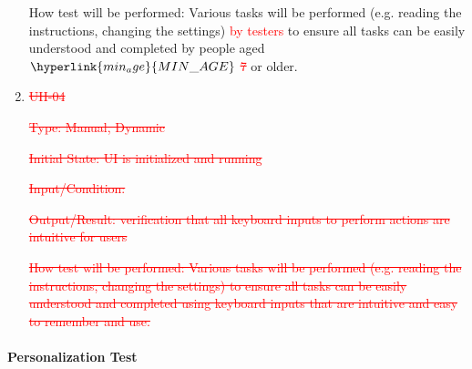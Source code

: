 \documentclass[12pt, titlepage]{article}
\begin{document}
\begin{enumerate}
How test will be performed: Various tasks will be performed (e.g. reading the
instructions, changing the settings) \textcolor{red}{by testers} to ensure all
tasks can be easily understood and completed by people aged \textcolor{red}{
$\hyperlink{min_age}{MIN\_AGE}$ \sout{7}} or older.

\item{\textcolor{red}{\sout{UH-04}}\\}

\textcolor{red}{\sout{Type: Manual, Dynamic}}

\textcolor{red}{\sout{Initial State: UI is initialized and running}}

\textcolor{red}{\sout{Input/Condition:}}

\textcolor{red}{\sout{Output/Result: verification that all keyboard inputs to
perform actions are intuitive for users}}

\textcolor{red}{\sout{How test will be performed: Various tasks will be
performed (e.g. reading the instructions, changing the settings) to ensure all
tasks can be easily understood and completed using keyboard inputs that are
intuitive and easy to remember and use.}}

\end{enumerate}

\paragraph{Personalization Test}
\end{document}
